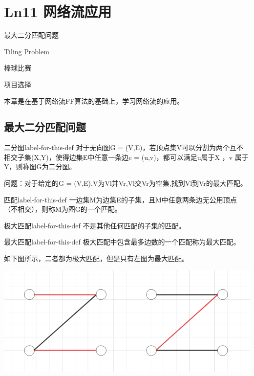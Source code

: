 \chapter{Ln11 网络流应用}

\begin{introduction}
\item 最大二分匹配问题
\item Tiling Problem
\item 棒球比赛
\item 项目选择
\end{introduction}

本章是在基于网络流FF算法的基础上，学习网络流的应用。

\section{最大二分匹配问题}

\begin{definition}{二分图}{label-for-this-def}
    对于无向图G = (V,E)，若顶点集V可以分割为两个互不相交子集(X,Y)，使得边集E中任意一条边e = (u,v)，都可以满足u属于X ，v 属于Y，则称图G为二分图。
\end{definition}

问题：对于给定的G = (V,E),V为Vl并Vr,Vl交Vr为空集,找到Vl到Vr的最大匹配。

\begin{definition}{匹配}{label-for-this-def}
    一边集M为边集E的子集，且M中任意两条边无公用顶点（不相交），则称M为图G的一个匹配。
\end{definition}

\begin{definition}{极大匹配}{label-for-this-def}
    不是其他任何匹配的子集的匹配。
\end{definition}

\begin{definition}{最大匹配}{label-for-this-def}
    极大匹配中包含最多边数的一个匹配称为最大匹配。
\end{definition}

如下图所示，二者都为极大匹配，但是只有左图为最大匹配。\\
\centerline{\includegraphics[scale=0.4]{image/networkflow1.png}}

